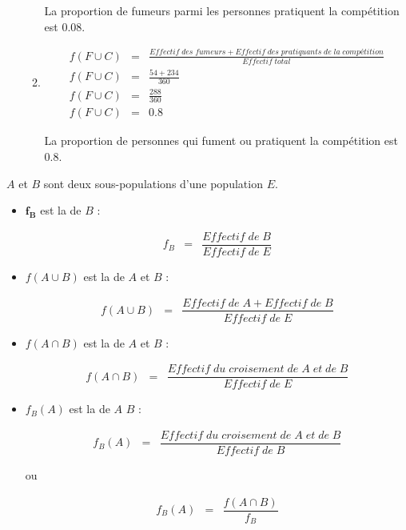 \documentclass[12pt,a4paper]{article}
\begin{document}
\begin{enumerate}[label=\arabic*)]
\begin{enumerate}[label=\alph*)]
		La proportion de fumeurs parmi les personnes pratiquent la compétition est \num{0.08}.
		
		\item \begin{eqnarray*}
			f(F \cup C) &=& \frac{Effectif\; des\; fumeurs + Effectif\; des\; pratiquants\; de\; la\; compétition}{Effectif\; total} \\
			f(F \cup C) &=& \frac{54 + 234}{360} \\
			f(F \cup C) &=& \frac{288}{360} \\
			f(F \cup C) &=& \num{0.8}
		\end{eqnarray*}
		
		La proportion de personnes qui fument ou pratiquent la compétition est \num{0.8}.
	\end{enumerate}

\end{enumerate}


\begin{mybilan}
	$A$ et $B$ sont deux sous-populations d'une population $E$.
	\begin{itemize}
		\item $\mathbf{f_B}$ est la  de $B$ :
		
		\begin{eqnarray*}
			f_B &=& \dfrac{Effectif\; de\; B }{Effectif\; de\; E}
		\end{eqnarray*}
	
		\item $f(A \cup B)$ est la  de $A$ et $B$ :
		
		\begin{eqnarray*}
			f(A \cup B) &=& \dfrac{Effectif\; de\; A + Effectif\; de\; B }{Effectif\; de\; E}
		\end{eqnarray*}
	
		\item $f(A \cap B)$ est la  de $A$ et $B$ :
		
		\begin{eqnarray*}
			f(A \cap B) &=& \dfrac{Effectif\; du\; croisement \; de\;A\; et\; de\; B }{Effectif\; de\; E}
		\end{eqnarray*}
	
		\item $f_B(A)$ est la  de $A$  $B$ :
		
		\begin{eqnarray*}
			f_B(A) &=& \dfrac{Effectif\; du\; croisement \; de\;A\; et\; de\; B }{Effectif\; de\; B}
		\end{eqnarray*}
	
		ou 
				
		\begin{eqnarray*}
			f_B(A) &=& \dfrac{f(A \cap B)}{f_B}
		\end{eqnarray*}
	
	
	\end{itemize}
\end{mybilan}
\end{document}
